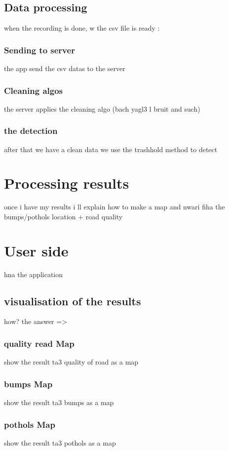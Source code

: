 \section{Data processing}
when the recording is done, w the csv file is ready :
\subsection{Sending to server}
the app send the csv datas to the server
\subsection{Cleaning algos}
the server applies the cleaning algo (bach yagl3 l bruit and such)
\subsection{the detection}
after that we have a clean data we use the trashhold method to detect 
\chapter{Processing results}
once i have my results
 i ll explain how to make a map and nwari fiha the bumps/pothols location + road quality 

\chapter{User side}
hna the application
\section{visualisation of the results}
how? the answer =>
\subsection{quality read Map}
show the result ta3 quality of road as a map
\subsection{bumps Map}
show the result ta3 bumps as a map
\subsection{pothols Map}
show the result ta3 pothols as a map


